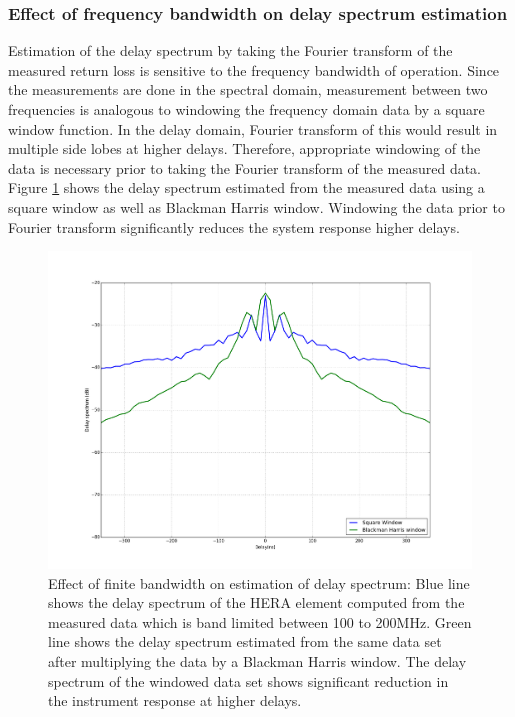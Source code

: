 \documentclass[twocolumn]{emulateapj}
\begin{document}
\subsubsection{Effect of frequency bandwidth on delay spectrum estimation}
Estimation of the delay spectrum by taking the Fourier transform of the measured return loss is sensitive to the frequency bandwidth of operation. Since the measurements are done in the spectral domain, measurement between two frequencies is analogous to windowing the frequency domain data by a square window function. In the delay domain, Fourier transform of this would result in multiple side lobes at higher delays. Therefore, appropriate windowing of the data is  necessary prior to taking the Fourier transform of the measured data. Figure \ref{fig:window} shows the delay spectrum estimated from the measured data using a square window as well as Blackman Harris window. Windowing the data prior to Fourier transform significantly reduces the system response higher delays.  
\begin{figure}
\centering
\includegraphics[width=\linewidth]{plots/window.png}
\caption{Effect of finite bandwidth on estimation of delay spectrum: Blue line shows the delay spectrum of the HERA element computed from the measured data which is band limited between 100 to 200MHz. Green line shows the delay spectrum estimated from the same data set after multiplying the data by a Blackman Harris window. The delay spectrum of the windowed data set shows significant reduction in the instrument response at higher delays.}
\label{fig:window}
\end{figure} 
\end{document}
